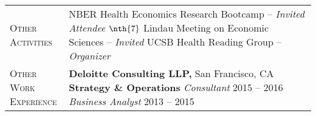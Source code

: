 \documentclass[11pt]{article}
\begin{document}
\begin{tabularx}{\textwidth}{@{}Y Z@{}}
	
	\textsc{Other \newline Activities} \vspace{20pt} & 
	NBER Health Economics Research Bootcamp -- \textit{Invited Attendee}
	\vspace{3pt} \newline
	$\nth{7}$ Lindau Meeting on Economic Sciences -- \textit{Invited}
	\vspace{3pt} \newline
	UCSB Health Reading Group -- \textit{Organizer}
	\\[20pt]
	

	\textsc{Other Work \newline Experience} \vspace{20pt} & 
	\textbf{Deloitte Consulting LLP,} San Francisco, CA
	\vspace{0pt} \newline
	\textbf{Strategy \& Operations} 
	\vspace{3pt} \newline
	\textit{Consultant} \hfill 2015 -- 2016
	\vspace{0pt} \newline
	\textit{Business Analyst} \hfill 2013 -- 2015
	\vspace{20pt} \\


\end{tabularx}
\end{document}
